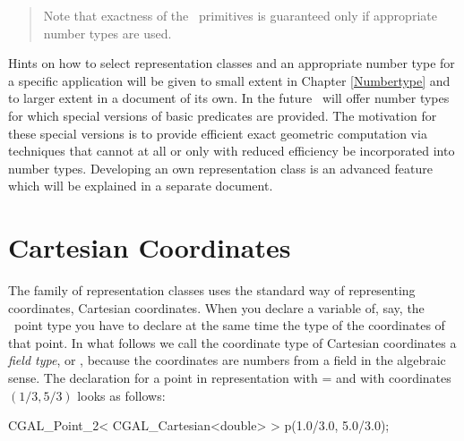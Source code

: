 \begin{quote}
Note that exactness of the \cgal\ primitives is guaranteed only
if appropriate number types are used.
\end{quote}

Hints on how to select representation classes
and an appropriate number type for a specific application will be given 
to small extent in Chapter \ref{Numbertype} and to larger extent
in a document of its own.
In the future \cgal\ will offer number types for which 
special versions of basic predicates are provided.
The motivation for these special versions is to provide
efficient exact geometric computation via techniques that cannot at all
or only with reduced efficiency be incorporated into number types.
Developing an own representation class  is an advanced feature which 
will be explained in a separate document.

\section{Cartesian Coordinates}
The  family of representation classes uses
the standard way of representing coordinates, Cartesian coordinates.
When you declare a variable of, say, the \cgal\ point type you
have to declare at the same time the type of the coordinates of that
point. In what follows we call the coordinate type
of Cartesian coordinates a {\em field type}, or
, because the coordinates are numbers from a field in
the algebraic sense.
The declaration for a point in  representation
with  =  and with coordinates $(1/3, 5/3)$ 
looks as follows:

\begin{cprog}

  CGAL_Point_2< CGAL_Cartesian<double> > p(1.0/3.0, 5.0/3.0);

\end{cprog}

